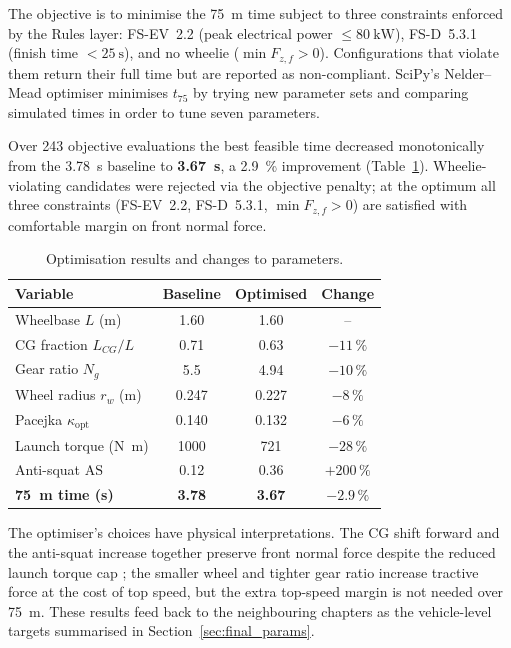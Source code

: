 \documentclass[11pt, a4paper]{report}
\numberwithin{equation}{section}
\begin{document}
\begin{refsection}
The objective is to minimise the \SI{75}{\metre} time subject to three
constraints enforced by the Rules layer: FS-EV~2.2 (peak electrical
power $\leq \SI{80}{\kilo\watt}$), FS-D~5.3.1 (finish time
$< \SI{25}{\second}$), and no wheelie
($\min F_{z,f} > 0$). Configurations that violate them return their full time but are
reported as non-compliant.
SciPy's Nelder--Mead optimiser \cite{press2007} minimises \(t_{75}\) by
trying new parameter sets and comparing simulated times in order to tune seven parameters.

Over \num{243} objective evaluations the best feasible time decreased
monotonically from the \SI{3.78}{\second} baseline to
\textbf{\SI{3.67}{\second}}, a \SI{2.9}{\percent} improvement
(Table~\ref{tab:optim_result}). Wheelie-violating candidates were
rejected via the objective penalty; at the optimum all three
constraints (FS-EV~2.2, FS-D~5.3.1, $\min F_{z,f} > 0$) are
satisfied with comfortable margin on front normal force.

\begin{table}[H]
\centering
\caption{Optimisation results and changes to parameters.}
\label{tab:optim_result}
\footnotesize
\begin{tabular}{|l|c|c|c|}
\hline
\textbf{Variable} & \textbf{Baseline} & \textbf{Optimised} & \textbf{Change} \\
\hline
Wheelbase $L$ (\si{\metre})      & 1.60 & 1.60 & -- \\
CG fraction $L_{CG}/L$           & 0.71 & 0.63 & $-11\,\%$ \\
Gear ratio $N_g$                 & 5.5 & 4.94 & $-10\,\%$ \\
Wheel radius $r_w$ (\si{\metre}) & 0.247 & 0.227 & $-8\,\%$ \\
Pacejka $\kappa_\text{opt}$      & 0.140 & 0.132 & $-6\,\%$ \\
Launch torque (\si{\newton\metre}) & 1000 & 721 & $-28\,\%$ \\
Anti-squat $\text{AS}$            & 0.12 & 0.36 & $+200\,\%$ \\
\hline
\textbf{\SI{75}{\metre} time (\si{\second})} & \textbf{3.78} & \textbf{3.67} & $\mathbf{-2.9\,\%}$ \\
\hline
\end{tabular}
\end{table}

The optimiser's choices have physical interpretations. The CG shift
forward and the anti-squat increase together preserve front normal
force despite the reduced launch torque cap ; the smaller
wheel and tighter gear ratio increase tractive force at the cost of
top speed, but the extra top-speed margin is not needed over
\SI{75}{\metre}. These results feed back to the neighbouring
chapters as the vehicle-level targets summarised in
Section~\ref{sec:final_params}.


\end{refsection}
\end{document}
